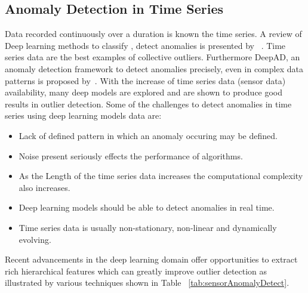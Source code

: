 \subsection{Anomaly Detection in Time Series }
\label{sec:timeseriesAD}
Data recorded continuously over a duration is known the time series. A review of Deep learning methods to classify , detect anomalies is presented by ~\cite{fawaz2018deep,langkvist2014review,gamboa2017deep,lu2017unsupervised}. Time series data are the best examples of collective outliers. Furthermore DeepAD, an anomaly detection framework to detect anomalies precisely, even in complex data patterns is proposed by~\cite{buda2018deepad}. With the increase of time series data (sensor data) availability, many deep models are explored and are shown to produce good results in outlier detection. Some of the challenges to detect anomalies in time series using deep learning models data are:
\begin{itemize}
    \item Lack of defined pattern in which an anomaly occuring may be defined.
    \item Noise present seriously effects the performance of algorithms.
    \item As the Length of the time series data increases the computational complexity also increases.
    \item Deep learning models should be able to detect anomalies in real time.
    \item  Time series data is usually non-stationary, non-linear and dynamically evolving.
\end{itemize}
Recent advancements in the deep learning domain offer
opportunities to extract rich hierarchical features which can greatly improve outlier detection as illustrated by various techniques shown in Table ~\ref{tab:sensorAnomalyDetect}.

